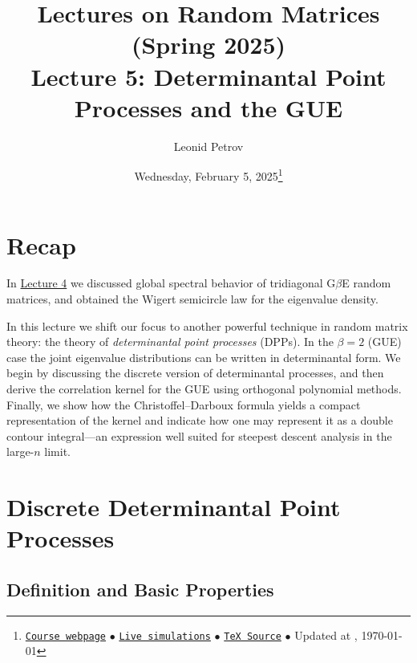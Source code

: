 \documentclass[letterpaper,11pt,oneside,reqno]{article}
\numberwithin{equation}{section}
\theoremstyle{definition}
\begin{document}
\title{Lectures on Random Matrices
(Spring 2025)
\\Lecture 5: Determinantal Point Processes and the GUE}


\date{Wednesday, February 5, 2025\footnote{\href{https://lpetrov.cc/rmt25/}{\texttt{Course webpage}}
$\bullet$ \href{https://lpetrov.cc/simulations/model/random-matrices/}{\texttt{Live simulations}}
$\bullet$ \href{https://lpetrov.cc/rmt25/rmt25-notes/rmt2025-l05.tex}{\texttt{TeX Source}}
$\bullet$
Updated at \currenttime, \today}}



\author{Leonid Petrov}


\maketitle
\tableofcontents




\section{Recap}
In 
\href{https://lpetrov.cc/rmt25/rmt25-notes/rmt2025-l04.pdf}{Lecture 4}
we discussed global spectral behavior of 
tridiagonal G$\beta$E random matrices,
and obtained the Wigert semicircle law for the eigenvalue density.

In this lecture we shift our focus to another powerful
technique in random matrix theory: the theory of
\emph{determinantal point processes} (DPPs). In the
$\beta=2$ (GUE) case the joint eigenvalue distributions can
be written in determinantal form. We begin by discussing the
discrete version of determinantal processes, and then derive
the correlation kernel for the GUE using orthogonal
polynomial methods. Finally, we show how the
Christoffel--Darboux formula yields a compact representation
of the kernel and indicate how one may represent it as a
double contour integral—an expression well suited for
steepest descent analysis in the large-$n$ limit.

\section{Discrete Determinantal Point Processes}
\label{sec:dpp-discrete}
\subsection{Definition and Basic Properties}
\end{document}

